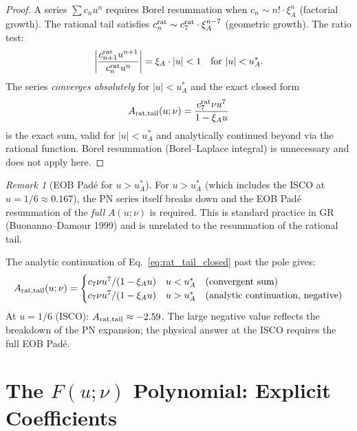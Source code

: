 \documentclass[11pt,a4paper]{article}
\theoremstyle{plain}
\theoremstyle{definition}
\theoremstyle{remark}
\newtheorem{remark}[theorem]{Remark}
\newcommand{\uA}{u_A^*}
\newcommand{\xiA}{\xi_A}
\begin{document}
\begin{proof}
A series $\sum c_n u^n$ requires Borel resummation when $c_n \sim n! \cdot\xiA^n$
(factorial growth).  The rational tail satisfies $c_n^{\rm rat}\sim c_7^{\rm rat}\cdot\xiA^{n-7}$
(geometric growth).  The ratio test:
\begin{equation}
  \left|\frac{c_{n+1}^{\rm rat}u^{n+1}}{c_n^{\rm rat}u^n}\right|
  = \xiA\cdot|u| < 1 \quad\text{for }|u|<\uA.
  \label{eq:ratio_test}
\end{equation}
The series \emph{converges absolutely} for $|u|<\uA$ and the exact closed form
\begin{equation}
  A_{\rm rat,tail}(u;\nu) = \frac{c_7^{\rm rat}\nu u^7}{1-\xiA u}
  \label{eq:rat_tail_closed}
\end{equation}
is the exact sum, valid for $|u|<\uA$ and analytically continued beyond via the
rational function.  Borel resummation (Borel--Laplace integral) is unnecessary and
does not apply here.
\end{proof}

\begin{remark}[EOB Pad\'e for $u>\uA$]
For $u>\uA$ (which includes the ISCO at $u=1/6\approx0.167$), the PN series
itself breaks down and the EOB Pad\'e resummation of the \emph{full} $A(u;\nu)$
is required.  This is standard practice in GR (Buonanno--Damour 1999) and is
unrelated to the resummation of the rational tail.
\end{remark}

The analytic continuation of Eq.~\eqref{eq:rat_tail_closed} past the pole gives:
\begin{equation}
  A_{\rm rat,tail}(u;\nu) = \begin{cases}
    c_7\nu u^7/(1-\xiA u) & u < \uA \quad(\text{convergent sum})\\
    c_7\nu u^7/(1-\xiA u) & u > \uA \quad(\text{analytic continuation, negative})
  \end{cases}
\end{equation}
At $u=1/6$ (ISCO): $A_{\rm rat,tail}\approx -2.59$.  The large negative value reflects
the breakdown of the PN expansion; the physical answer at the ISCO requires the full
EOB Pad\'e.

\section{The $F(u;\nu)$ Polynomial: Explicit Coefficients}
\label{sec:F}
\end{document}
